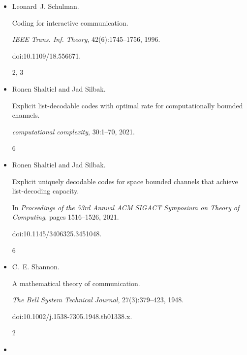 \documentclass[10pt,a4paper]{article}
\begin{document}
\begin{itemize}
Irving S Reed.


A class of multiple-error-correcting codes and the decoding scheme.


\emph{IEEE Transactions on Information Theory}, 4(4):38–49, 1954.


doi:10.1109/TIT.1954.1057465.


6




\item[] 
[26]

Leonard J. Schulman.


Coding for interactive communication.


\emph{IEEE Trans. Inf. Theory}, 42(6):1745–1756, 1996.


doi:10.1109/18.556671.


2, 3




\item[] 
[27]

Ronen Shaltiel and Jad Silbak.


Explicit list-decodable codes with optimal rate for computationally
bounded channels.


\emph{computational complexity}, 30:1–70, 2021.


6




\item[] 
[28]

Ronen Shaltiel and Jad Silbak.


Explicit uniquely decodable codes for space bounded channels that
achieve list-decoding capacity.


In \emph{Proceedings of the 53rd Annual ACM SIGACT Symposium on Theory
of Computing}, pages 1516–1526, 2021.


doi:10.1145/3406325.3451048.


6




\item[] 
[29]

C. E. Shannon.


A mathematical theory of communication.


\emph{The Bell System Technical Journal}, 27(3):379–423, 1948.


doi:10.1002/j.1538-7305.1948.tb01338.x.


2




\item[] 
[30]


\end{itemize}
\end{document}
